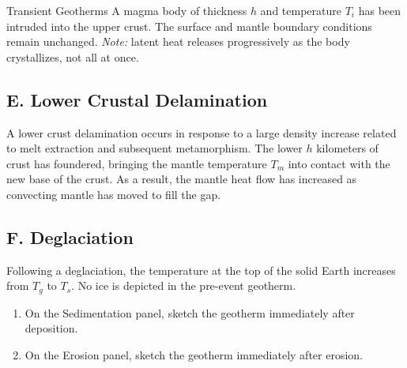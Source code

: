 \begin{activity}{Transient Geotherms}
A magma body of thickness $h$ and temperature $T_i$ has been intruded into the upper crust. The surface and mantle boundary conditions remain unchanged. \emph{Note:} latent heat releases progressively as the body crystallizes, not all at once.

\subsection*{E. Lower Crustal Delamination}

A lower crust delamination occurs in response to a large density increase related to melt extraction and subsequent metamorphism. The lower $h$ kilometers of crust has foundered, bringing the mantle temperature $T_m$ into contact with the new base of the crust.  As a result, the mantle heat flow has increased as convecting mantle has moved to fill the gap.

\subsection*{F. Deglaciation}

Following a deglaciation, the temperature at the top of the solid Earth increases from $T_g$ to $T_s$.  No ice is depicted in the pre-event geotherm.

\begin{minipage}{0.48\textwidth}
\end{minipage}
\hfill
\begin{minipage}{0.48\textwidth}
\end{minipage}

\begin{questions}
  \begin{enumerate}[label=(\alph*)]
    \item On the Sedimentation panel, sketch the geotherm immediately after deposition.
    \answerbox[1.5cm]

    \item On the Erosion panel, sketch the geotherm immediately after erosion.
    \answerbox[1.5cm]


\end{enumerate}
\end{questions}
\end{activity}

